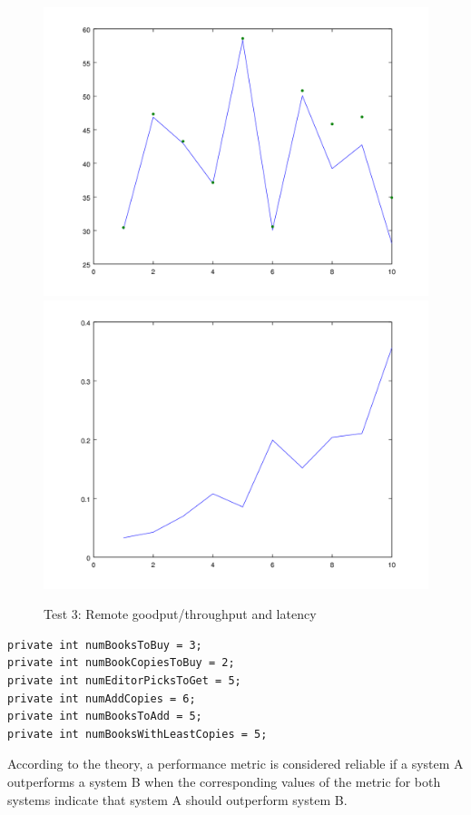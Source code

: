 \documentclass{article}      %
\begin{document}
\begin{figure}[ht]
\centering
 \includegraphics[scale=.33]{graphs/graph6-goodput}
 \includegraphics[scale=.33]{graphs/graph6-latency}
\caption{Test 3: Remote goodput/throughput and latency \label{overflow}}
\end{figure}

\begin{verbatim}
private int numBooksToBuy = 3;
private int numBookCopiesToBuy = 2;
private int numEditorPicksToGet = 5;
private int numAddCopies = 6;
private int numBooksToAdd = 5;
private int numBooksWithLeastCopies = 5;
\end{verbatim}
 
According to the theory, a performance metric is considered reliable if a system A outperforms a system B when the corresponding values of the metric for both systems indicate that system A should outperform system B. \\
\end{document}

